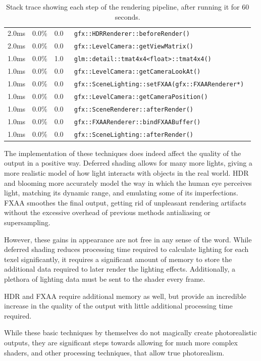 \documentclass[11pt, oneside]{report}
\begin{document}
\begin{table}[!htbp]
\begin{tabularx}{0.88\textwidth}{| r | c | c | >{\tt}X |}
		2.0ms & 0.0\% & 0.0 & {gfx::HDRRenderer::beforeRender()} \\
		2.0ms & 0.0\% & 0.0 & {gfx::LevelCamera::getViewMatrix()} \\
		1.0ms & 0.0\% & 1.0 & {glm::detail::tmat4x4<float>::tmat4x4()} \\[1ex]
		1.0ms & 0.0\% & 0.0 & {gfx::LevelCamera::getCameraLookAt()} \\
		1.0ms & 0.0\% & 0.0 & {gfx::SceneLighting::setFXAA(gfx::FXAARenderer*)} \\
		1.0ms & 0.0\% & 0.0 & {gfx::LevelCamera::getCameraPosition()} \\
		1.0ms & 0.0\% & 0.0 & {gfx::SceneRenderer::afterRender()} \\[1ex]
		1.0ms & 0.0\% & 0.0 & {gfx::FXAARenderer::bindFXAABuffer()} \\
		1.0ms & 0.0\% & 0.0 & {gfx::SceneLighting::afterRender()} \\
		\hline
	\end{tabularx}
	
	\caption{Stack trace showing each step of the rendering pipeline, after running it for 60 seconds.}
	\label{tab:booktabs}
\end{table}

The implementation of these techniques does indeed affect the quality of the output in a positive way. Deferred shading allows for many more lights, giving a more realistic model of how light interacts with objects in the real world. \gls{HDR} and blooming more accurately model the way in which the human eye perceives light, matching its dynamic range, and emulating some of its imperfections. \gls{FXAA} smoothes the final output, getting rid of unpleasant rendering artifacts without the excessive overhead of previous methods antialiasing or \gls{supersampling}.

However, these gains in appearance are not free in any sense of the word. While deferred shading reduces processing time required to calculate lighting for each \gls{texel} significantly, it requires a significant amount of memory to store the additional data required to later render the lighting effects. Additionally, a plethora of lighting data must be sent to the shader every frame.

\gls{HDR} and \gls{FXAA} require additional memory as well, but provide an incredible increase in the quality of the output with little additional processing time required.

While these basic techniques by themselves do not magically create photorealistic outputs, they are significant steps towards allowing for much more complex shaders, and other processing techniques, that allow true photorealism. 
\end{document}
